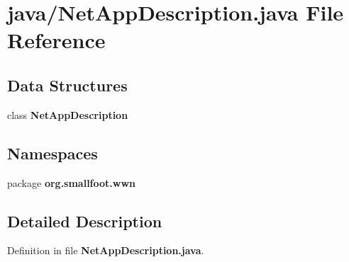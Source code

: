 \section{java/\-Net\-App\-Description.java \-File \-Reference}
\label{NetAppDescription_8java}
\subsection*{\-Data \-Structures}
\begin{DoxyCompactItemize}
\item 
class {\bf \-Net\-App\-Description}
\end{DoxyCompactItemize}
\subsection*{\-Namespaces}
\begin{DoxyCompactItemize}
\item 
package {\bf org.\-smallfoot.\-wwn}
\end{DoxyCompactItemize}


\subsection{\-Detailed \-Description}


\-Definition in file {\bf \-Net\-App\-Description.\-java}.

